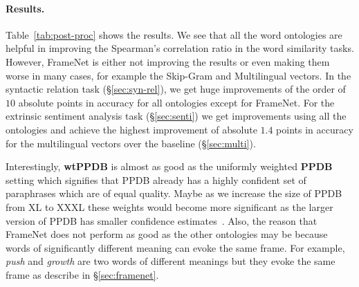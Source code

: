 \documentclass[11pt]{article}
\begin{document}
\paragraph{Results.} Table~\ref{tab:post-proc} shows the results.
We see that all the word ontologies are helpful in improving
the Spearman's correlation ratio in the word similarity tasks. However, FrameNet is
either not improving the results or even making them worse in many cases, for example the Skip-Gram and Multilingual vectors. In the syntactic relation task (\S\ref{sec:syn-rel}), we get huge improvements of the order of $10$ absolute points
in accuracy for all ontologies except for FrameNet. For the extrinsic sentiment analysis task (\S\ref{sec:senti}) we get improvements using all the ontologies and achieve the highest improvement of absolute $1.4$ points in accuracy for the multilingual vectors over the baseline (\S\ref{sec:multi}). 

Interestingly, \textbf{wtPPDB} is almost as good as the uniformly weighted \textbf{PPDB} setting which signifies that PPDB already has a highly confident
set of paraphrases which are of equal quality. Maybe as we increase the size of
PPDB from XL to XXXL these weights would become more significant as the larger
version of PPDB has smaller confidence estimates~\cite{ganitkevitch2013ppdb}. 
Also, the reason that FrameNet does not perform as good as the other 
ontologies may be because words of significantly different meaning can evoke the 
same frame. For example, \textit{push} and \textit{growth} are two words of 
different meanings but they evoke the same frame as describe in \S\ref{sec:framenet}.
\end{document}
